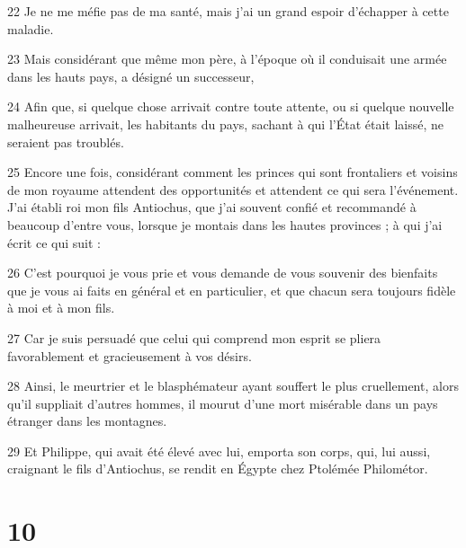 \par 22 Je ne me méfie pas de ma santé, mais j'ai un grand espoir d'échapper à cette maladie.
\par 23 Mais considérant que même mon père, à l'époque où il conduisait une armée dans les hauts pays, a désigné un successeur,
\par 24 Afin que, si quelque chose arrivait contre toute attente, ou si quelque nouvelle malheureuse arrivait, les habitants du pays, sachant à qui l'État était laissé, ne seraient pas troublés.
\par 25 Encore une fois, considérant comment les princes qui sont frontaliers et voisins de mon royaume attendent des opportunités et attendent ce qui sera l'événement. J'ai établi roi mon fils Antiochus, que j'ai souvent confié et recommandé à beaucoup d'entre vous, lorsque je montais dans les hautes provinces ; à qui j'ai écrit ce qui suit :
\par 26 C'est pourquoi je vous prie et vous demande de vous souvenir des bienfaits que je vous ai faits en général et en particulier, et que chacun sera toujours fidèle à moi et à mon fils.
\par 27 Car je suis persuadé que celui qui comprend mon esprit se pliera favorablement et gracieusement à vos désirs.
\par 28 Ainsi, le meurtrier et le blasphémateur ayant souffert le plus cruellement, alors qu'il suppliait d'autres hommes, il mourut d'une mort misérable dans un pays étranger dans les montagnes.
\par 29 Et Philippe, qui avait été élevé avec lui, emporta son corps, qui, lui aussi, craignant le fils d'Antiochus, se rendit en Égypte chez Ptolémée Philométor.

\chapter{10}

